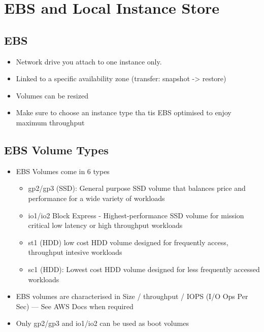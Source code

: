 \section{EBS and Local Instance Store}

\subsection{EBS}
\begin{itemize}
    \item Network drive you attach to one instance only.
    \item Linked to a specific availability zone (transfer: snapshot -> restore)
    \item Volumes can be resized
    \item Make sure to choose an instance type tha tis EBS optimised to enjoy maximum throughput
\end{itemize}

\subsection{EBS Volume Types}
\begin{itemize}
    \item EBS Volumes come in 6 types
    \begin{itemize}
        \item gp2/gp3 (SSD): General purpose SSD volume that balances price and performance for a wide variety of workloads
        \item io1/io2 Block Express - Highest-performance SSD volume for mission critical low latency or high throughput workloads
        \item st1 (HDD) low cost HDD volume designed for frequently access, throughput intesive workloads
        \item sc1 (HDD): Lowest cost HDD volume designed for less frequently accessed workloads
    \end{itemize}
    \item EBS volumes are characterised in Size / throughput / IOPS (I/O Ops Per Sec)
    --- See AWS Docs when required
    \item Only gp2/gp3 and io1/io2 can be used as boot volumes
\end{itemize}

